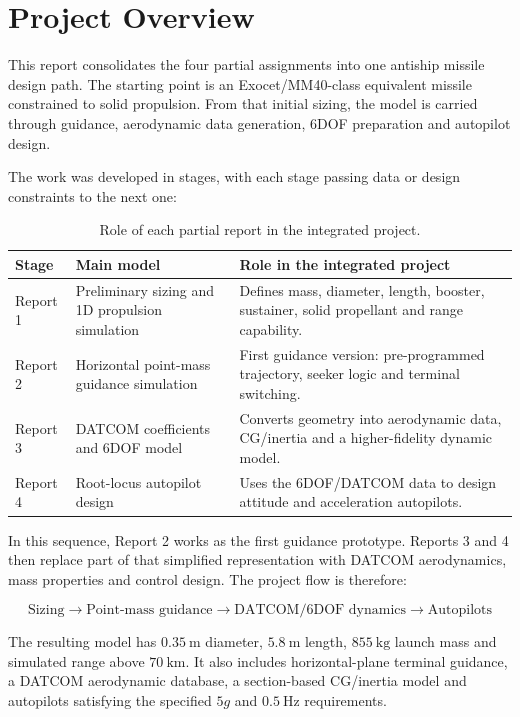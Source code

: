 \section{Project Overview}

This report consolidates the four partial assignments into one antiship missile design path. The starting point is an Exocet/MM40-class equivalent missile constrained to solid propulsion. From that initial sizing, the model is carried through guidance, aerodynamic data generation, 6DOF preparation and autopilot design.

The work was developed in stages, with each stage passing data or design constraints to the next one:

\begin{table}[H]
\centering
\caption{Role of each partial report in the integrated project.}
\begin{tabular}{p{}p{}p{}}
\toprule
Stage & Main model & Role in the integrated project \\
\midrule
Report 1 & Preliminary sizing and 1D propulsion simulation & Defines mass, diameter, length, booster, sustainer, solid propellant and range capability. \\
Report 2 & Horizontal point-mass guidance simulation & First guidance version: pre-programmed trajectory, seeker logic and terminal switching. \\
Report 3 & DATCOM coefficients and 6DOF model & Converts geometry into aerodynamic data, CG/inertia and a higher-fidelity dynamic model. \\
Report 4 & Root-locus autopilot design & Uses the 6DOF/DATCOM data to design attitude and acceleration autopilots. \\
\bottomrule
\end{tabular}
\end{table}

In this sequence, Report 2 works as the first guidance prototype. Reports 3 and 4 then replace part of that simplified representation with DATCOM aerodynamics, mass properties and control design. The project flow is therefore:

\[
\text{Sizing} \rightarrow
\text{Point-mass guidance} \rightarrow
\text{DATCOM/6DOF dynamics} \rightarrow
\text{Autopilots}
\]

The resulting model has \(0.35~\text{m}\) diameter, \(5.8~\text{m}\) length, \(855~\text{kg}\) launch mass and simulated range above \(70~\text{km}\). It also includes horizontal-plane terminal guidance, a DATCOM aerodynamic database, a section-based CG/inertia model and autopilots satisfying the specified \(5g\) and \(0.5~\text{Hz}\) requirements.
